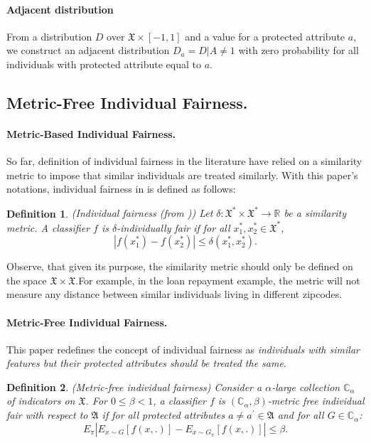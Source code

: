 \documentclass{article}
\newtheorem{defn}{Definition}[section]
\begin{document}
\paragraph{Adjacent distribution}
From a distribution $ D$ over $\mathfrak{X}\times [-1, 1]$ and a value for a protected attribute $a$, we construct an adjacent distribution $D_{a}=D|A\neq 1$ with zero probability for all individuals with protected attribute equal to $a$. 

\subsection{Metric-Free Individual Fairness.}

\paragraph{Metric-Based Individual Fairness.}
So far, definition of individual fairness in the literature have relied on a similarity metric to impose that similar individuals are treated similarly. With this paper's notations, individual fairness in \cite{dwork2012fairness} is defined as follows:


\begin{defn}(Individual fairness (from \cite{dwork2012fairness}))
\label{def: if}
Let $\delta:\mathfrak{X}^{*} \times \mathfrak{X}^{*} \rightarrow \mathbb{R}$ be a similarity metric. A classifier $f$ is $\delta$-individually fair if for all $x_{1}^{*}, x_{2}^{*} \in \mathfrak{X}^{*}$, 
$$|f(x_{1}^{*}) - f(x_{2}^{*})| \leq \delta(x_{1}^{*}, x_{2}^{*}).$$
\end{defn}

Observe, that given its purpose, the similarity metric should only be defined on the space $\mathfrak{X} \times \mathfrak{X}$.For example, in the loan repayment example, the metric will not measure any distance between similar individuals living in different zipcodes. 

\paragraph{Metric-Free Individual Fairness.}
This paper redefines the concept of individual fairness as \textit{individuals with similar features but their protected attributes should be treated the same}. 


\begin{defn}(Metric-free individual fairness)
\label{def: mfif}
Consider a $\alpha$-large collection $\mathbb{C}_{\alpha}$ of indicators on $\mathfrak{X}$. For $0\leq \beta <1$, a classifier $f$ is $(\mathbb{C}_{\alpha}, \beta)$-metric free individual fair with respect to $\mathfrak{A}$ if for all protected attributes $a\neq a^{'}\in \mathfrak{A}$ and for all $G\in \mathbb{C}_{\alpha}$:
$$  E_{\pi}\left |E_{x\sim G}[f(x, .)] - E_{x\sim G_{\pi}}[f(x, .)]\right| \leq \beta.$$
\end{defn}
\end{document}
